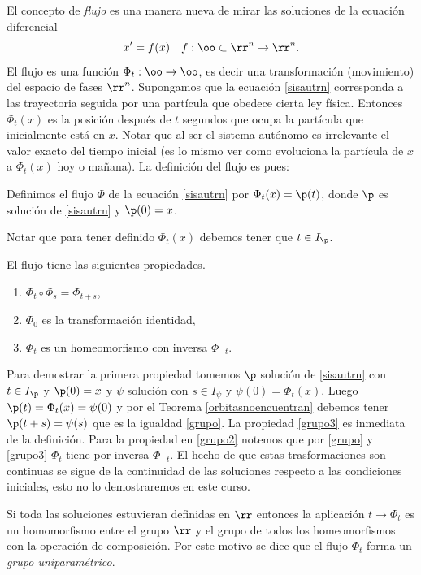 El concepto de \emph{flujo} es una manera nueva de mirar las
soluciones de la ecuación diferencial
\begin{equation}\label{sisautrn}
    x'=f(x)\quad f:\oo\subset\rr^n\to\rr^n.
\end{equation}
 El flujo es una función $\Phi_t:\oo\to\oo$, es decir una
 transformación (movimiento) del espacio de fases $\rr^n$.
 Supongamos que la ecuación \eqref{sisautrn} corresponda a las trayectoria
 seguida por una partícula que obedece cierta ley física.
 Entonces  $\Phi_t(x)$ es la posición después de $t$ segundos que
 ocupa la partícula que inicialmente está en $x$. Notar que al ser
 el sistema autónomo es irrelevante el valor exacto del tiempo
 inicial (es lo mismo ver como evoluciona la partícula de $x$ a
 $\Phi_t(x)$ hoy o mañana). La definición del flujo es pues:
 \begin{definicion} Definimos el flujo $\Phi$ de la ecuación
 \eqref{sisautrn} por $\Phi_t(x)=\p(t)$, donde $\p$ es solución de
 \eqref{sisautrn} y $\p(0)=x$.
\end{definicion}
Notar que para tener definido $\Phi_t(x)$ debemos tener que $t\in
I_{\p}$.
\begin{teorema}
El flujo tiene las siguientes propiedades.
\begin{enumerate}
    \item\label{grupo} $\Phi_t\circ\Phi_s=\Phi_{t+s}$,
    \item\label{grupo3} $\Phi_0$ es la transformación identidad,
    \item\label{grupo2} $\Phi_t$ es un homeomorfismo con inversa $\Phi_{-t}$.
\end{enumerate}
\end{teorema}
\begin{demo}
Para demostrar la primera propiedad tomemos $\p$ solución de
\eqref{sisautrn} con $t\in I_{\p}$ y $\p(0)=x$ y $\psi$ solución
con $s\in I_{\psi}$ y $\psi(0)=\Phi_t(x)$. Luego
$\p(t)=\Phi_t(x)=\psi(0)$ y por el Teorema
\ref{orbitasnoencuentran} debemos tener $\p(t+s)=\psi(s)$ que es
la igualdad \ref{grupo}. La propiedad \ref{grupo3} es inmediata de
la definición. Para la propiedad en \ref{grupo2} notemos que por
\ref{grupo} y \ref{grupo3} $\Phi_t$ tiene por inversa $\Phi_{-t}$.
El hecho de que estas trasformaciones son continuas se sigue de la
continuidad de las soluciones respecto a las condiciones
iniciales, esto no lo demostraremos en este curso.
\end{demo}

Si toda las soluciones estuvieran definidas en $\rr$ entonces la
aplicación $t\to\Phi_t$ es un homomorfismo entre el grupo $\rr$ y
el grupo de todos los homeomorfismos con la operación de
composición. Por este motivo se dice que el flujo $\Phi_t$ forma
un \emph{grupo uniparamétrico}.

